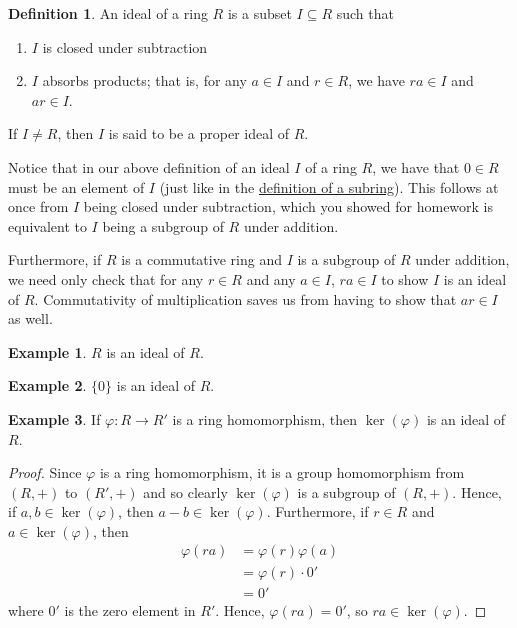 \documentclass[12pt,letterpaper,DIV=11,final]{scrartcl}
\theoremstyle{plain}
\theoremstyle{definition}
\newtheorem{definition}{Definition}[section]
\newtheorem{example}{Example}[section]
\theoremstyle{remark}
\begin{document}
\begin{definition}
  An ideal of a ring $R$ is a subset $I \subseteq R$ such that
  \begin{enumerate}
    \item $I$ is closed under subtraction
    \item $I$ absorbs products; that is, for any $a \in I$ and $r \in R$, we have $ra \in I$ and $ar \in I$.
  \end{enumerate}
  If $I \neq R$, then $I$ is said to be a proper ideal of $R$.
\end{definition}

Notice that in our above definition of an ideal $I$ of a ring $R$, we have that $0 \in R$ must be an element of $I$ (just like in the \hyperref[def:subring]{definition of a subring}).
This follows at once from $I$ being closed under subtraction, which you showed for homework is equivalent to $I$ being a subgroup of $R$ under addition.

Furthermore, if $R$ is a commutative ring and $I$ is a subgroup of $R$ under addition, we need only check that for any $r \in R$ and any $a \in I$, $ra \in I$ to show $I$ is an ideal of $R$.
Commutativity of multiplication saves us from having to show that $ar \in I$ as well.

\begin{example}
  $R$ is an ideal of $R$.
\end{example}

\begin{example}
  $\{ 0 \}$ is an ideal of $R$.
\end{example}

\begin{example}
  If $\varphi : R \to R'$ is a ring homomorphism, then $\ker(\varphi)$ is an ideal of $R$.

  \begin{proof}
    Since $\varphi$ is a ring homomorphism, it is a group homomorphism from $(R, +)$ to $(R', +)$ and so clearly $\ker(\varphi)$ is a subgroup of $(R, +)$.
    Hence, if $a, b \in \ker(\varphi)$, then $a - b \in \ker(\varphi)$.
    Furthermore, if $r \in R$ and $a \in \ker(\varphi)$, then
    \begin{align*}
      \varphi(ra) &= \varphi(r) \varphi(a) \\
                  &= \varphi(r) \cdot 0' \\
                  &= 0'
    \end{align*}
    where $0'$ is the zero element in $R'$.
    Hence, $\varphi(ra) = 0'$, so $ra \in \ker(\varphi)$.
  \end{proof}
\end{example}
\end{document}

